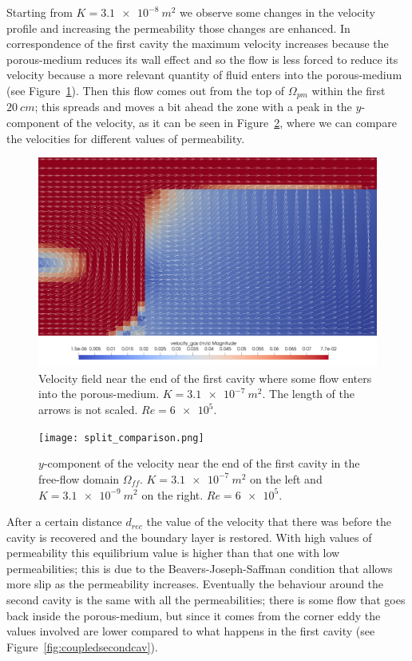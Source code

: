 \documentclass[11pt, a4paper]{article}
\theoremstyle{definition}
\begin{document}
Starting from $K=\SI{3.1e-8}{m^2}$ we observe some changes in the velocity 
profile and increasing the permeability those changes are enhanced. In 
correspondence of the first cavity the maximum velocity increases because the 
porous-medium reduces its wall effect and so the flow is less forced to reduce 
its velocity because a more relevant quantity of fluid enters into the 
porous-medium (see Figure~\ref{fig:coupled_arrows}). Then this flow comes out 
from the top of $\Omega_{pm}$ within the first $\SI{20}{cm}$; this spreads and 
moves a bit ahead the zone with a peak in the $y$-component of the velocity, as 
it can be seen in Figure~\ref{fig:coupled_vel_split}, where we can compare the 
velocities for different values of permeability.
\begin{figure}
	\centering
	\includegraphics[width=\textwidth]{coupled_first_cavity.png}
	\caption{Velocity field near the end of the first cavity where some flow 
		enters into the porous-medium. $K=\SI{3.1e-7}{m^2}$. The length of the 
		arrows is not scaled. $Re=\num{6e5}$.}
	\label{fig:coupled_arrows}
\end{figure}
\begin{figure}
	\centering
	\texttt{[image: split\_comparison.png]}
	\caption{$y$-component of the velocity near the end of the first cavity in 
	the free-flow domain $\Omega_{ff}$. $K = \SI{3.1e-7}{m^2}$ on the left and 
	$K = \SI{3.1e-9}{m^2}$ on the right. $Re=\num{6e5}$.}
	\label{fig:coupled_vel_split}
\end{figure}

After a certain distance $d_{rec}$ the value of the velocity that there was 
before the cavity is recovered and the boundary layer is restored. With high 
values of permeability this equilibrium value is higher than that one with low 
permeabilities; this is due to the Beavers-Joseph-Saffman condition that allows 
more slip as the permeability increases. Eventually the behaviour around the 
second cavity is the same with all the permeabilities; there is some flow that 
goes back inside the porous-medium, but since it comes from the corner eddy the 
values involved are lower compared to what happens in the first cavity (see 
Figure~\ref{fig:coupledsecondcav}).
\end{document}
